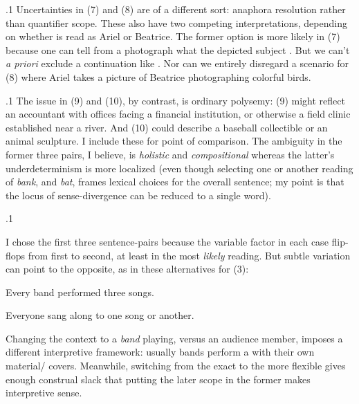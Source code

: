 \documentclass[11pt, twocolumn]{article}
\begin{document}
\p.1{%
\:\+Uncertainties in \exsRef(7) and \exsRef(8) are of a different sort: anaphora resolution rather than quantifier scope. \> 
These also have two competing interpretations, depending on whether  is read as Ariel or Beatrice. \>  The
former option is more likely in \exsRef(7) because one can tell from a photograph what the depicted subject
. \>  But we can't \textit{a priori} exclude a continuation like . \> 
Nor can we entirely disregard a scenario for \exsRef(8) where Ariel takes a picture of
Beatrice photographing colorful birds.\<\;
}%

\p.1{%
\:\+The issue in \exsRef(9) and \exsRef(10), by contrast, is ordinary polysemy: \exsRef(9) might reflect an
accountant with offices facing a financial institution, or otherwise a field clinic
established \pgl{}near
a river. \>  And \exsRef(10) could describe a baseball collectible or an animal sculpture. \> 
I include these for point of comparison. \>  The ambiguity in the former three pairs,
I believe, is \textit{holistic} and \textit{compositional} whereas the latter's underdeterminism
is more localized (even though selecting one or another reading of \textit{bank}, and
\textit{bat}, frames lexical choices for the overall sentence; my point is that
the locus of sense-divergence can be reduced to a single word).\<\;
}%

\p.1{%
\:\+I chose the first three sentence-pairs because the variable factor in each
case flip-flops from first to second, at least
in the most \textit{likely} reading. \>  But subtle variation can point to the opposite, as in these alternatives
for \exsRef(3):

\begin{exsGroup}

\exsItem{}  \>  Every band performed three songs. {\sssm}

\exsItem{}  \>  Everyone sang along to one song or another. \> 

\end{exsGroup}

\nip{}%
Changing the context to a \textit{band} playing, versus an audience member, imposes a different interpretive
framework: usually bands perform a  with their own material/ covers. \>  Meanwhile, switching
from the exact  to the more flexible  gives enough construal slack that
putting the later scope in the former makes interpretive sense. \> 
\ifnum{}\else{\thispagestyle{two}}\fi\;
}%
\end{document}

